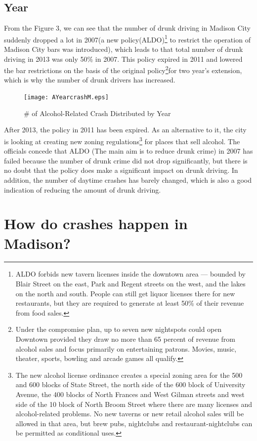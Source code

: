 \documentclass[15pt]{article}
\begin{document}
\subsection{Year}
From the Figure 3, we can see that the number of drunk driving in Madison City suddenly dropped a lot in 2007(a new policy(ALDO)\footnote{ALDO forbids new tavern licenses inside the downtown area — bounded by Blair Street on the east, Park and Regent streets on the west, and the lakes on the north and south. People can still get liquor licenses there for new restaurants, but they are required to generate at least 50\% of their revenue from food sales.} to restrict the operation of Madison City bars was introduced), which leads to that total number of drunk driving in 2013 was only 50\% in 2007. This policy expired in 2011 and lowered the bar restrictions on the basis of the original policy\footnote{Under the compromise plan, up to seven new nightspots could open Downtown provided they draw no more than 65 percent of revenue from alcohol sales and focus primarily on entertaining patrons. Movies, music, theater, sports, bowling and arcade games all qualify.}for two year's extension, which is why the number of drunk drivers has increased.
\begin{figure}[H]
\centering
\texttt{[image: AYearcrashM.eps]}
\caption{\# of Alcohol-Related Crash Distributed by Year}
\end{figure}
After 2013, the policy in 2011 has been expired. As an alternative to it, the city is looking at creating new zoning regulations\footnote{The new alcohol license ordinance creates a special zoning area for the 500 and 600 blocks of State Street, the north side of the 600 block of University Avenue, the 400 blocks of North Frances and West Gilman streets and west side of the 10 block of North Broom Street where there are many licenses and alcohol-related problems. No new taverns or new retail alcohol sales will be allowed in that area, but brew pubs, nightclubs and restaurant-nightclubs can be permitted as conditional uses.} for places that sell alcohol. The officials concede that ALDO (The main aim is to reduce drunk crime) in 2007 has failed because the number of drunk crime did not drop significantly, but there is no doubt that the policy does make a significant impact on drunk driving. In addition, the number of daytime crashes has barely changed, which is also a good indication of reducing the amount of drunk driving.

\section{How do crashes happen in Madison?}
\end{document}
